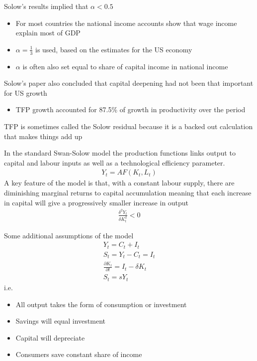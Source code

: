 \documentclass{beamer}
\begin{document}
\begin{frame}
 Solow's results implied that $\alpha<0.5$
  \begin{itemize}
    \item For most countries the national income accounts show that wage income explain most of GDP
    \item $\alpha=\frac{1}{3}$ is used, based on the estimates for the US economy
    \item $\alpha$ is often also set equal to share of capital income in national income
  \end{itemize}
  \medskip
  Solow's paper also concluded that capital deepening had not been that important for US growth
  \begin{itemize}
    \item TFP growth accounted for 87.5\% of growth in productivity over the period    
  \end{itemize}
  \medskip
  TFP is sometimes called the Solow residual because it is a backed out calculation that makes things add up
\end{frame}

\begin{frame}
In the standard Swan-Solow model the production functions links output to capital and labour inputs as well as a technological efficiency parameter.
\begin{align}
  Y_t = AF(K_t,L_t) 
\end{align}
\medskip
A key feature of the model is that, with a constant labour supply, there are diminishing marginal returns to capital accumulation meaning that each increase in capital will give a progressively smaller increase in output
\begin{align}
  \frac{\delta^2Y_t}{\delta K_t^2}<0
\end{align}
\end{frame}

\begin{frame}
 Some additional assumptions of the model  
  \begin{align}
    Y_t =C_t+I_t\\ 
    S_t=Y_t-C_t=I_t \\ 
    \frac{\partial K_t}{\partial t}=I_t -\delta K_t \\
    S_t=sY_t
  \end{align}
  \medskip
  i.e. 
  \begin{itemize}
    \item All output takes the form of consumption or investment 
    \item Savings will equal investment
    \item Capital will depreciate
    \item Consumers save constant share of income
  \end{itemize}
\end{frame}
\end{document}
